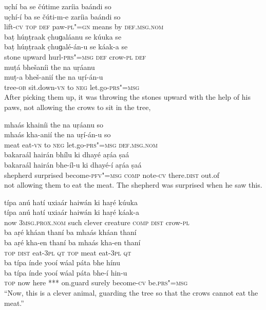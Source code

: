 \begin{exe}
\ex
\label{ex:13}
\glll uc̣hí	ba	se	čútime	zaríia	baándi	so \\
uc̣hí-í	ba	se	čúti-m-e	zaríia	baándi	so \\
lift-\textsc{cv} \textsc{top} \textsc{def}	paw-\textsc{pl"=gn}	means	by	\textsc{def.msg.nom} \\
\glll baṭ	húṇṭraak	c̣huɡaláanu	se	kúuka	se \\
baṭ	húṇṭraak	c̣huɡalé-án-u	se	káak-a	se \\
stone	upward	hurl-\textsc{prs"=msg} \textsc{def}	crow-\textsc{pl} \textsc{def} \\
\glll muṭá bhešaníi	the	na	uṛáanu \\
muṭ-a	bheš-anií	the	na	uṛí-án-u \\
tree-\textsc{ob}	sit.down-\textsc{vn}	to	\textsc{neg}	let.go-\textsc{prs"=msg} \\
\glt After picking them up, it was throwing the stones upward with the help of his paws, not allowing the crows to sit in the tree,

\ex
\label{ex:14}
\glll mhaás	khainíi	the	na	uṛáanu	so \\
mhaás	kha-anií	the	na	uṛí-án-u	so \\
meat	eat-\textsc{vn}	to \textsc{neg}	let.go-\textsc{prs"=msg} \textsc{def.msg.nom} \\
\glll bakaraál	hairán	bhílu	ki	dhayé aṛáa	ṣaá \\
bakaraál	hairán	bhe-íl-u	ki	dhayé-í aṛáa	ṣaá \\
shepherd	surprised	become-\textsc{pfv"=msg} \textsc{comp}	note-\textsc{cv} there.\textsc{dist}	out.of \\
\glt not allowing them to eat the meat. The shepherd was surprised when he saw this.

\ex
\label{ex:15}
\glll típa	anú	hatí	uxiaár	haiwán	ki	haṛé	kúuka \\
típa	anú	hatí	uxiaár	haiwán	ki	haṛé	káak-a \\
now \textsc{3msg.prox.nom}	such	clever	creature	\textsc{comp} \textsc{dist}	crow-\textsc{pl} \\
\glll ba	aṛé	kháan	thaní	ba	mhaás	kháan	thaní \\
ba	aṛé	kha-en	thaní	ba	mhaás	kha-en	thaní \\
\textsc{top}  \textsc{dist}	eat-\textsc{3pl} \textsc{qt} \textsc{top}	meat	eat-\textsc{3pl} \textsc{qt} \\
\glll ba	típa	índe	yooí	wáal	páta	bhe	hínu \\
ba	típa	índe	yooí	wáal	páta	bhe-í	hin-u \\
\textsc{top}	now	here	***	on.guard	surely	become-\textsc{cv}	be.\textsc{prs"=msg} \\
\glt “Now, this is a clever animal, guarding the tree so that the crows cannot eat the meat.”


\end{exe}
